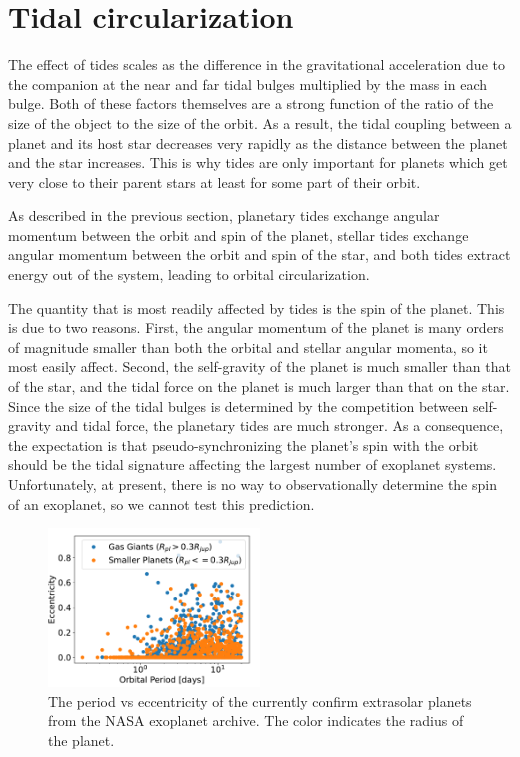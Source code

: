 \section{Tidal circularization}
%
\label{sec:synchronization_circularization_alignment}

The effect of tides scales as the difference in the gravitational acceleration
due to the companion at the near and far tidal bulges multiplied by the mass in
each bulge. Both of these factors themselves are a strong function of the ratio
of the size of the object to the size of the orbit. As a result, the tidal
coupling between a planet and its host star decreases very rapidly as the
distance between the planet and the star increases. This is why tides are only
important for planets which get very close to their parent stars at least for
some part of their orbit.

As described in the previous section, planetary tides exchange angular
momentum between the orbit and spin of the planet, stellar tides exchange
angular momentum between the orbit and spin of the star, and both tides extract
energy out of the system, leading to orbital circularization.

The quantity that is most readily affected by tides is the spin of the planet.
This is due to two reasons. First, the angular momentum of the planet is many
orders of magnitude smaller than both the orbital and stellar angular momenta,
so it most easily affect. Second, the self-gravity of the planet is much smaller
than that of the star, and the tidal force on the planet is much larger than
that on the star. Since the size of the tidal bulges is determined by the
competition between self-gravity and tidal force, the planetary tides are much
stronger. As a consequence, the expectation is that pseudo-synchronizing the
planet's spin with the orbit should be the tidal signature affecting the largest
number of exoplanet systems. Unfortunately, at present, there is no way to
observationally determine the spin of an exoplanet, so we cannot test this
prediction.

\begin{figure}[t]
%
    \centering
%
    \includegraphics[width=0.5\textwidth]{period_eccentricity.pdf}
%
    \caption{
%
        The period vs eccentricity of the currently confirm extrasolar planets
        from the NASA exoplanet archive. The color indicates the radius of the
        planet.
%
    }
%
    \label{fig:period-eccentricity}
%
\end{figure}

